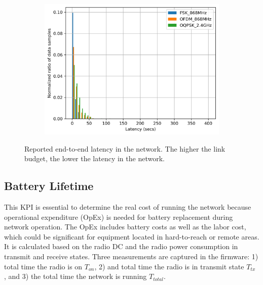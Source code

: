 \documentclass[sensors,article,submit,moreauthors,pdftex]{Definitions/mdpi}
\begin{document}
\begin{figure}
\begin{subfigure}{0.49\columnwidth}
		\centering
    	\includegraphics[width=1.00\columnwidth]{latency_pdf}
    	\label{fig:latency_pdf}
	\end{subfigure}
	\caption{
	    Reported end-to-end latency in the network.
	    The higher the link budget, the lower the latency in the network.
	}
	\label{fig:latency_all}
\end{figure}

\subsection{Battery Lifetime}
\label{sec:battery_lifetime}


This KPI is essential to determine the real cost of running the network because operational expenditure (OpEx) is needed for battery replacement during network operation. 
The OpEx includes battery costs as well as the labor cost, which could be significant for equipment located in hard-to-reach or remote areas. 
It is calculated based on the radio DC and the radio power consumption in transmit and receive states. 
Three measurements are captured in the firmware: 1) total time the radio is on $T_{on}$, 2) and total time the radio is in transmit state $T_{tx}$ , and 3) the total time the network is running $T_{total}$. 
\end{document}
